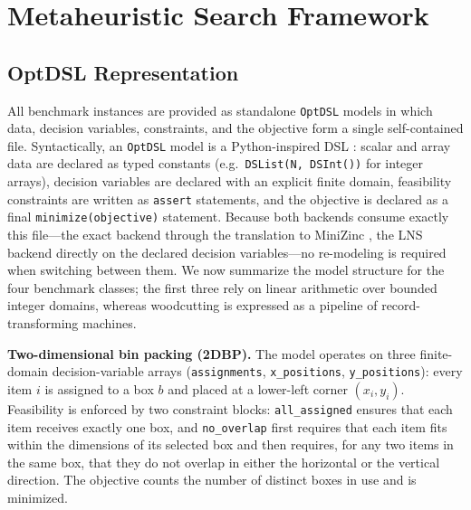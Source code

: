 \documentclass[11pt,a4paper]{article}
\begin{document}
\section{Metaheuristic Search Framework}
\subsection{OptDSL Representation}
All benchmark instances are provided as standalone \texttt{OptDSL} models
in which data, decision variables, constraints, and the objective form a
single self-contained file.
Syntactically, an \texttt{OptDSL} model is a Python-inspired DSL
\citep{delrio2026optdsl}: scalar and array data are declared as typed
constants (e.g.\ \texttt{DSList(N, DSInt())} for integer arrays), decision
variables are declared with an explicit finite domain, feasibility
constraints are written as \texttt{assert} statements, and the objective
is declared as a final
\texttt{minimize(objective)} statement.
Because both backends consume exactly this file---the exact backend through
the translation to MiniZinc \citep{delrio2026optdsl}, the LNS backend
directly on the declared decision variables---no re-modeling is required
when switching between them.
We now summarize the model structure for the four benchmark classes; the
first three rely on linear arithmetic over bounded integer domains, whereas
woodcutting is expressed as a pipeline of record-transforming machines.

\textbf{Two-dimensional bin packing (2DBP).}
The model operates on three finite-domain decision-variable arrays
(\texttt{assignments}, \texttt{x\_positions}, \texttt{y\_positions}):
every item $i$ is assigned to a box $b$ and placed at a lower-left corner
$(x_i,y_i)$.
Feasibility is enforced by two constraint blocks: \texttt{all\_assigned}
ensures that each item receives exactly one box, and \texttt{no\_overlap}
first requires that each item fits within the dimensions of its selected
box and then requires, for any two items in the same box, that they do not
overlap in either the horizontal or the vertical direction.
The objective counts the number of distinct boxes in use and is minimized.
\end{document}
